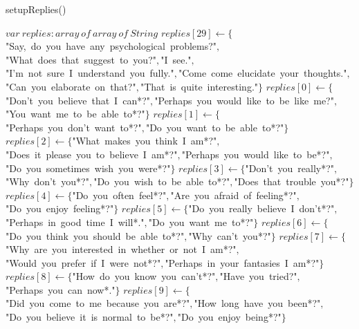 \documentclass[a4paper,10pt]{article}
\begin{document}
\begin{algorithm}
\caption{setupReplies()}
\begin{algorithmic}[5]

\STATE {}
\STATE {}
\STATE {}
  \STATE \(var\ replies:array\ of\ array\ of\ String\)
  \STATE {}
  \STATE {}
  \STATE \(replies[29]\gets\{\)"{}Say,\ do\ you\ have\ any\ psychological\ problems?"{}\(,\)"{}What\ does\ that\ suggest\ to\ you?"{}\(,\)"{}I\ see."{}\(,\)"{}I'{}m\ not\ sure\ I\ understand\ you\ fully."{}\(,\)"{}Come\ come\ elucidate\ your\ thoughts."{}\(,\)"{}Can\ you\ elaborate\ on\ that?"{}\(,\)"{}That\ is\ quite\ interesting."{}\(\}\)
  \STATE \(replies[0]\gets\{\)"{}Don'{}t\ you\ believe\ that\ I\ can*?"{}\(,\)"{}Perhaps\ you\ would\ like\ to\ be\ like\ me?"{}\(,\)"{}You\ want\ me\ to\ be\ able\ to*?"{}\(\}\)
  \STATE \(replies[1]\gets\{\)"{}Perhaps\ you\ don'{}t\ want\ to*?"{}\(,\)"{}Do\ you\ want\ to\ be\ able\ to*?"{}\(\}\)
  \STATE \(replies[2]\gets\{\)"{}What\ makes\ you\ think\ I\ am*?"{}\(,\)"{}Does\ it\ please\ you\ to\ believe\ I\ am*?"{}\(,\)"{}Perhaps\ you\ would\ like\ to\ be*?"{}\(,\)"{}Do\ you\ sometimes\ wish\ you\ were*?"{}\(\}\)
  \STATE \(replies[3]\gets\{\)"{}Don'{}t\ you\ really*?"{}\(,\)"{}Why\ don'{}t\ you*?"{}\(,\)"{}Do\ you\ wish\ to\ be\ able\ to*?"{}\(,\)"{}Does\ that\ trouble\ you*?"{}\(\}\)
  \STATE \(replies[4]\gets\{\)"{}Do\ you\ often\ feel*?"{}\(,\)"{}Are\ you\ afraid\ of\ feeling*?"{}\(,\)"{}Do\ you\ enjoy\ feeling*?"{}\(\}\)
  \STATE \(replies[5]\gets\{\)"{}Do\ you\ really\ believe\ I\ don'{}t*?"{}\(,\)"{}Perhaps\ in\ good\ time\ I\ will*."{}\(,\)"{}Do\ you\ want\ me\ to*?"{}\(\}\)
  \STATE \(replies[6]\gets\{\)"{}Do\ you\ think\ you\ should\ be\ able\ to*?"{}\(,\)"{}Why\ can'{}t\ you*?"{}\(\}\)
  \STATE \(replies[7]\gets\{\)"{}Why\ are\ you\ interested\ in\ whether\ or\ not\ I\ am*?"{}\(,\)"{}Would\ you\ prefer\ if\ I\ were\ not*?"{}\(,\)"{}Perhaps\ in\ your\ fantasies\ I\ am*?"{}\(\}\)
  \STATE \(replies[8]\gets\{\)"{}How\ do\ you\ know\ you\ can'{}t*?"{}\(,\)"{}Have\ you\ tried?"{}\(,\)"{}Perhaps\ you\ can\ now*."{}\(\}\)
  \STATE \(replies[9]\gets\{\)"{}Did\ you\ come\ to\ me\ because\ you\ are*?"{}\(,\)"{}How\ long\ have\ you\ been*?"{}\(,\)"{}Do\ you\ believe\ it\ is\ normal\ to\ be*?"{}\(,\)"{}Do\ you\ enjoy\ being*?"{}\(\}\)

\end{algorithmic}
\end{algorithm}
\end{document}
